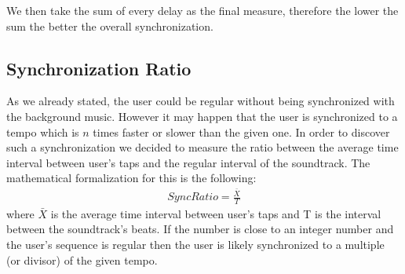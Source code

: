 We then take the sum of every delay as the final measure, therefore the lower the sum the better the overall synchronization.

\subsection{Synchronization Ratio}
As we already stated, the user could be regular without being synchronized with the background music. However it may happen that the user is synchronized to a tempo which is $n$ times faster or slower than the given one.
In order to discover such a synchronization we decided to measure the ratio between the average time interval between user's taps and the regular interval of the soundtrack. The mathematical formalization for this is the following:
\begin{align}
	SyncRatio = \frac{\bar{X}}{T}
\end{align}
where $\bar{X}$ is the average time interval between user's taps and T is the interval between the soundtrack's beats.
If the number is close to an integer number and the user's sequence is regular then the user is likely synchronized to a multiple (or divisor) of the given tempo.
